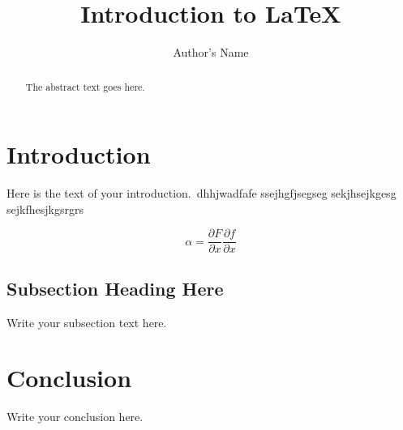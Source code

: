 \documentclass{article}
\begin{document}
\title{Introduction to \LaTeX{}}
\author{Author's Name}

\maketitle

\begin{abstract}
The abstract text goes here.
\end{abstract}

\section{Introduction}
Here is the text of your introduction.\
dhhjwadfafe
ssejhgfjsegseg
sekjhsejkgesg
sejkfhesjkgsrgrs

\begin{equation}
    \label{simple_equation}
    \alpha = \frac{\partial F}{\partial x}\frac{\partial f}{\partial x}
\end{equation}

\subsection{Subsection Heading Here}
Write your subsection text here.

\section{Conclusion}
Write your conclusion here.
\end{document}
